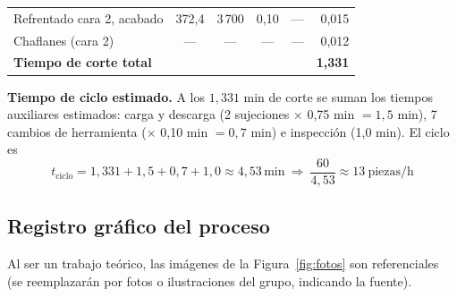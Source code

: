 \documentclass[12pt,a4paper]{article}
\newcommand{\umin}{\,\mathrm{min}}
\begin{document}
\begin{table}[!htb]
\begin{tabular}{l c c c c r}
		Refrentado cara 2, acabado       & 372,4               & 3\,700            & 0,10                 & ---                      & 0,015             \\
		Chaflanes (cara 2)               & ---                 & ---               & ---                  & ---                      & 0,012             \\
		\midrule
		\textbf{Tiempo de corte total}   &                     &                   &                      &                          &
		\textbf{1,331}                                                                                                                                   \\
	\end{tabular}
\end{table}

\textbf{Tiempo de ciclo estimado.} A los $1{,}331$ min de corte se suman los
tiempos auxiliares estimados: carga y descarga (2 sujeciones $\times$ 0,75 min
$=1{,}5$ min), 7 cambios de herramienta ($\times$ 0,10 min $=0{,}7$ min) e
inspección (1,0 min). El ciclo es
\[
	t_{\text{ciclo}}=1{,}331+1{,}5+0{,}7+1{,}0\approx4{,}53\umin
	\ \Rightarrow\ \frac{60}{4{,}53}\approx13\ \text{piezas/h}
\]

\subsection{Registro gráfico del proceso}

Al ser un trabajo teórico, las imágenes de la Figura~\ref{fig:fotos} son
referenciales (se reemplazarán por fotos o ilustraciones del grupo, indicando la
fuente).
\end{document}
